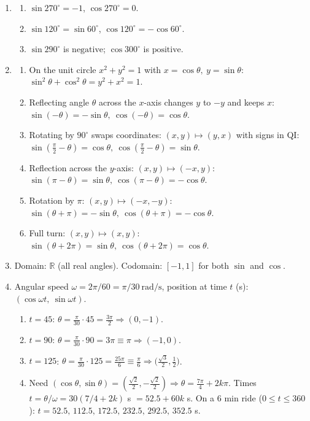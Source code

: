 \documentclass{article}
\begin{document}
\begin{enumerate}[label=\textbf{\arabic*.}, leftmargin=*, itemsep=0.6em]
  \item
  \begin{enumerate}[leftmargin=0.8cm]
    \item \(\sin270^\circ=-1\), \(\cos270^\circ=0\).
    \item \(\sin120^\circ=\sin 60^\circ\), \(\cos120^\circ=-\cos 60^\circ\).
    \item \(\sin290^\circ\) is \(\text{negative}\); \(\cos300^\circ\) is \(\text{positive}\).
  \end{enumerate}

  \item
  \begin{enumerate}[leftmargin=0.8cm]
    \item On the unit circle \(x^2+y^2=1\) with \(x=\cos\theta,\ y=\sin\theta\):
      \(\sin^2\theta+\cos^2\theta=y^2+x^2=1\).
    \item Reflecting angle \(\theta\) across the \(x\)-axis changes \(y\) to \(-y\) and keeps \(x\):
      \(\sin(-\theta)=-\sin\theta,\ \cos(-\theta)=\cos\theta\).
    \item Rotating by \(90^\circ\) swaps coordinates: \((x,y)\mapsto(y,x)\) with signs in QI:
      \(\sin(\tfrac{\pi}{2}-\theta)=\cos\theta,\ \cos(\tfrac{\pi}{2}-\theta)=\sin\theta\).
    \item Reflection across the \(y\)-axis: \((x,y)\mapsto(-x,y)\):
      \(\sin(\pi-\theta)=\sin\theta,\ \cos(\pi-\theta)=-\cos\theta\).
    \item Rotation by \(\pi\): \((x,y)\mapsto(-x,-y)\):
      \(\sin(\theta+\pi)=-\sin\theta,\ \cos(\theta+\pi)=-\cos\theta\).
    \item Full turn: \((x,y)\mapsto(x,y)\):
      \(\sin(\theta+2\pi)=\sin\theta,\ \cos(\theta+2\pi)=\cos\theta\).
  \end{enumerate}

  \item Domain: \(\mathbb{R}\) (all real angles). Codomain: \([-1,1]\) for both \(\sin\) and \(\cos\).

  \item Angular speed \(\omega=2\pi/60=\pi/30\ \mathrm{rad/s}\), position at time \(t\) (s): \((\cos\omega t,\ \sin\omega t)\).
  \begin{enumerate}[leftmargin=0.8cm]
    \item \(t=45\): \(\theta=\tfrac{\pi}{30}\cdot45=\tfrac{3\pi}{2}\Rightarrow(0,-1)\).
    \item \(t=90\): \(\theta=\tfrac{\pi}{30}\cdot90=3\pi\equiv\pi\Rightarrow(-1,0)\).
    \item \(t=125\): \(\theta=\tfrac{\pi}{30}\cdot125=\tfrac{25\pi}{6}\equiv\tfrac{\pi}{6}\Rightarrow\bigl(\tfrac{\sqrt3}{2},\tfrac12\bigr)\).
    \item Need \((\cos\theta,\sin\theta)=(\tfrac{\sqrt2}{2},-\tfrac{\sqrt2}{2})\Rightarrow\theta= \tfrac{7\pi}{4}+2k\pi\).
          Times \(t=\theta/\omega=30(7/4+2k)\) s \(=52.5+60k\) s.
          On a \(6\) min ride (\(0\le t\le360\)): \(t=52.5,\,112.5,\,172.5,\,232.5,\,292.5,\,352.5\) s.
  \end{enumerate}


\end{enumerate}
\end{document}
